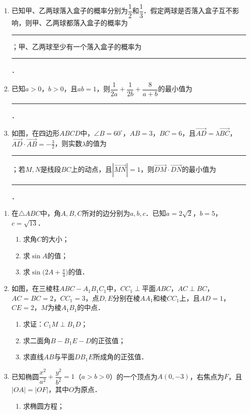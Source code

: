 \begin{description}
\begin{enumerate}[leftmargin=5pt]
        \item 已知甲、乙两球落入盒子的概率分别为$\dfrac{1}{2}$和$\dfrac{1}{3}$．假定两球是否落入盒子互不影响，则甲、乙两球都落入盒子的概率为\rule[-0.3ex]{3em}{0.4pt}；甲、乙两球至少有一个落入盒子的概率为\rule[-0.3ex]{3em}{0.4pt}．
        \item 已知$a>0$，$b>0$，且$ab=1$，则$\dfrac{1}{2a}+\dfrac{1}{2b}+\dfrac{8}{a+b}$的最小值为\rule[-0.3ex]{3em}{0.4pt}．
        \item 如图，在四边形$ABCD$中，$\angle B=60^{\circ}$，$AB=3$，$BC=6$，且$\overrightarrow{AD}=\lambda\overrightarrow{BC}$，$\overrightarrow{AD}\cdot\overrightarrow{AB}=-\frac{3}{2}$，则实数$\lambda$的值为\rule[-0.3ex]{3em}{0.4pt}；若$M,N$是线段$BC$上的动点，且$|\overrightarrow{MN}|=1$，则$\overrightarrow{DM}\cdot\overrightarrow{DN}$的最小值为\rule[-0.3ex]{3em}{0.4pt}．
    \end{enumerate}
    \item[三、解答题]
    \begin{enumerate}[leftmargin=5pt]
      \addtocounter{enumi}{+15}
        \item 在$\triangle ABC$中，角$A,B,C$所对的边分别为$a,b,c$．已知$a=2\sqrt{2}$，$b=5$，$c=\sqrt{13}$．
        \begin{enumerate}[label=(\arabic*)]
            \item 求角$C$的大小；
            \item 求$\sin A$的值；
            \item 求$\sin\bigl(2A+\frac{\pi}{4}\bigr)$的值．
        \end{enumerate}
        \item 如图，在三棱柱$ABC-A_{1}B_{1}C_{1}$中，$CC_{1}\perp$平面$ABC$，$AC\perp BC$，$AC=BC=2$，$CC_{1}=3$，点$D,E$分别在棱$AA_{1}$和棱$CC_{1}$上，且$AD=1$，$CE=2$，$M$为棱$A_{1}B_{1}$的中点．
        \begin{enumerate}[label=(\arabic*)]
            \item 求证：$C_{1}M\perp B_{1}D$；
            \item 求二面角$B-B_{1}E-D$的正弦值；
            \item 求直线$AB$与平面$DB_{1}E$所成角的正弦值．
        \end{enumerate}        \item 已知椭圆$\dfrac{x^{2}}{a^{2}}+\dfrac{y^{2}}{b^{2}}=1$（$a>b>0$）的一个顶点为$A(0,-3)$，右焦点为$F$，且$|OA|=|OF|$，其中$O$为原点．
        \begin{enumerate}[label=(\arabic*)]
            \item 求椭圆方程；

\end{enumerate}
\end{enumerate}
\end{description}
